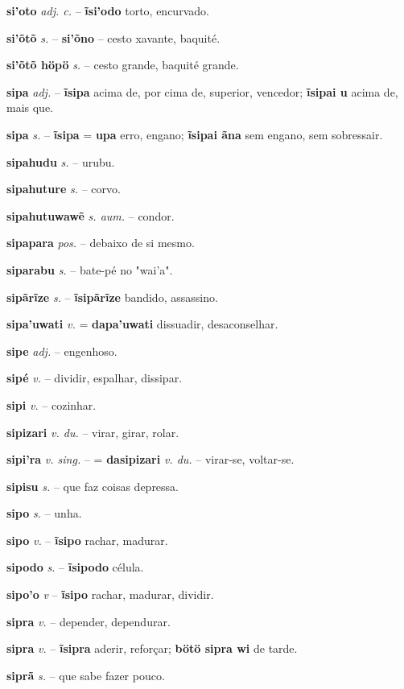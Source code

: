 \textbf{si'oto} \textit{adj. c.} -- \textbf{ĩsi'odo} torto, encurvado.

\textbf{si'õtõ} \textit{s.} -- \textbf{si'õno} -- cesto xavante, baquité.

\textbf{si'õtõ höpö} \textit{s.} -- cesto grande, baquité grande.

\textbf{sipa} \textit{adj.} -- \textbf{ĩsipa} acima de, por cima de, superior, vencedor; \textbf{ĩsipai u} acima de, mais que.

\textbf{sipa} \textit{s.} -- \textbf{ĩsipa} = \textbf{upa} erro, engano; \textbf{ĩsipai ãna} sem engano, sem sobressair.

\textbf{sipahudu} \textit{s.} -- urubu.

\textbf{sipahuture} \textit{s.} -- corvo.

\textbf{sipahutuwawẽ} \textit{s. aum.} -- condor.

\textbf{sipapara} \textit{pos.} -- debaixo de si mesmo.

\textbf{siparabu} \textit{s.} -- bate-pé no "wai'a".

\textbf{sipãrĩze} \textit{s.} -- \textbf{ĩsipãrĩze} bandido, assassino.

\textbf{sipa'uwati} \textit{v.} = \textbf{dapa'uwati} dissuadir, desaconselhar.

\textbf{sipe} \textit{adj.} -- engenhoso.

\textbf{sipé} \textit{v.} -- dividir, espalhar, dissipar.

\textbf{sipi} \textit{v.} -- cozinhar.

\textbf{sipizari} \textit{v. du.} -- virar, girar, rolar.

\textbf{sipi'ra} \textit{v. sing.} -- = \textbf{dasipizari} \textit{v. du.} -- virar-se, voltar-se.

\textbf{sipisu} \textit{s.} -- que faz coisas depressa.

\textbf{sipo} \textit{s.} -- unha.

\textbf{sipo} \textit{v.} -- \textbf{ĩsipo} rachar, madurar.

\textbf{sipodo} \textit{s.} -- \textbf{ĩsipodo} célula.

\textbf{sipo'o} \textit{v} -- \textbf{ĩsipo} rachar, madurar, dividir.

\textbf{sipra} \textit{v.} -- depender, dependurar.

\textbf{sipra} \textit{v.} -- \textbf{ĩsipra} aderir, reforçar; \textbf{bötö sipra wi} de tarde.

\textbf{siprã} \textit{s.} -- que sabe fazer pouco.

